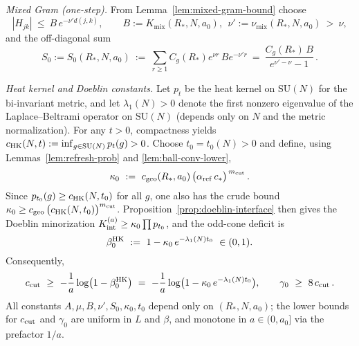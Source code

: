 \documentclass[11pt]{amsart}
\begin{document}
\emph{Mixed Gram (one-step).} From Lemma~\ref{lem:mixed-gram-bound} choose
\[
  |H_{jk}|\ \le\ B\,e^{-\nu' d(j,k)},\qquad B:=K_{\mathrm{mix}}(R_*,N,a_0),\ \ \nu':=\nu_{\mathrm{mix}}(R_*,N,a_0)\ >\ \nu,
\]
and the off-diagonal sum
\[
  S_0:=S_0(R_*,N,a_0)\ :=\ \sum_{r\ge 1} C_g(R_*) e^{\nu r}\, B e^{-\nu' r}
   \ =\ \frac{C_g(R_*)\,B}{e^{\nu'-\nu}-1}\,.
\]

\emph{Heat kernel and Doeblin constants.} Let $p_t$ be the heat kernel on $\mathrm{SU}(N)$ for the bi-invariant metric, and let $\lambda_1(N)>0$ denote the first nonzero eigenvalue of the Laplace--Beltrami operator on $\mathrm{SU}(N)$ (depends only on $N$ and the metric normalization). For any $t>0$, compactness yields $c_{\rm HK}(N,t):=\inf_{g\in \mathrm{SU}(N)} p_t(g)>0$. Choose $t_0=t_0(N)>0$ and define, using Lemmas~\ref{lem:refresh-prob} and \ref{lem:ball-conv-lower},
\[
  \kappa_0\ :=\ c_{\rm geo}(R_*,a_0)\,\bigl(\alpha_{\rm ref}\,c_*\bigr)^{\,m_{\rm cut}}\,.
\]
Since $p_{t_0}(g)\ge c_{\rm HK}(N,t_0)$ for all $g$, one also has the crude bound $\kappa_0\ge c_{\rm geo}\,\bigl(c_{\rm HK}(N,t_0)\bigr)^{m_{\rm cut}}$. Proposition~\ref{prop:doeblin-interface} then gives the Doeblin minorization $K_{\rm int}^{(a)}\ge \kappa_0 \prod p_{t_0}$, and the odd-cone deficit is
\[
  \beta_0^{\rm HK}\ :=\ 1-\kappa_0\,e^{-\lambda_1(N) t_0}\ \in (0,1).
\]
Consequently,
\[
  c_{\rm cut}\ \ge\ -\frac{1}{a}\log\bigl(1-\beta_0^{\rm HK}\bigr)
   \ =\ -\frac{1}{a}\log\bigl(1-\kappa_0\,e^{-\lambda_1(N) t_0}\bigr),
  \qquad \gamma_0\ \ge\ 8\,c_{\rm cut}\,.
\]
All constants $A,\mu,B,\nu',S_0,\kappa_0,t_0$ depend only on $(R_*,N,a_0)$; the lower bounds for $c_{\rm cut}$ and $\gamma_0$ are uniform in $L$ and $\beta$, and monotone in $a\in(0,a_0]$ via the prefactor $1/a$.
\end{document}
